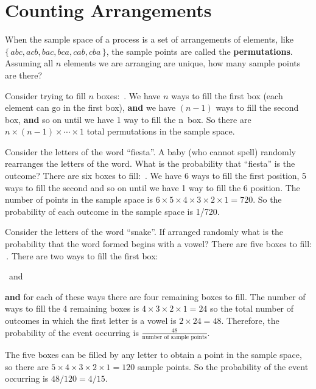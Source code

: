 \section{Counting Arrangements}
When the sample space of a process is a set of arrangements of elements, like~$\{\,abc, acb, bac, bca, cab, cba\,\}$, the sample points are called the \textbf{permutations}. Assuming all $n$ elements we are arranging are unique, how many sample points are there?
\smallskip\par
Consider trying to fill $n$ boxes: \,.
We have $n$ ways to fill the first box (each element can go in the first box), \textbf{and} we have $(n-1)$ ways to fill the second box, \textbf{and} so on until we have 1 way to fill the n~box. So there are $n \times (n-1) \times \cdots \times 1$ total permutations in the sample space.
\begin{example}
Consider the letters of the word ``fiesta''. A baby (who cannot spell) randomly rearranges the letters of the word. What is the probability that ``fiesta'' is the outcome?
\tcblower
There are six boxes to fill: \,.
We have 6 ways to fill the first position, 5 ways to fill the second and so on until we have 1 way to fill the 6 position. The number of points in the sample space is $6 \times 5 \times 4 \times 3 \times 2 \times 1 = 720$. So the probability of each outcome in the sample space is 1/720.
\end{example}
\begin{example}
Consider the letters of the word ``snake''. 
If arranged randomly what is the probability that the word formed begins with a vowel?
\tcblower
There are five boxes to fill: \,. There are two ways to fill the first box: 
\begin{center}
\ and 
\end{center}
\textbf{and} for each of these ways there are four remaining boxes to fill. The number of ways to fill the 4 remaining boxes is $4 \times 3 \times 2 \times 1 = 24$ so the total number of outcomes in which the first letter is a vowel is $2 \times 24 = 48$. Therefore, the probability of the event occurring is $\frac{48}{\text{number of sample points}}$.
\smallskip\par
The five boxes can be filled by any letter to obtain a point in the sample space, so there are $5 \times 4 \times 3 \times 2 \times 1 = 120$ sample points. So the probability of the event occurring is $48/120 = 4/15$.
\end{example}

